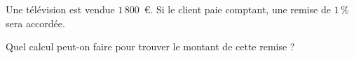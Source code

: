 
Une télévision est vendue $1\,800$~€. Si le client paie comptant, une remise de $1\,\%$ sera accordée.

Quel calcul peut-on faire pour trouver le montant de cette remise ?

\smallskip
{}
